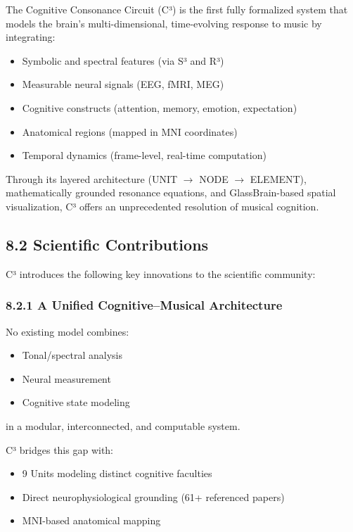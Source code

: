 The Cognitive Consonance Circuit (C³) is the first fully formalized system that models the brain’s multi-dimensional, time-evolving response to music by integrating:

\begin{itemize}
    \item Symbolic and spectral features (via S³ and R³)
    \item Measurable neural signals (EEG, fMRI, MEG)
    \item Cognitive constructs (attention, memory, emotion, expectation)
    \item Anatomical regions (mapped in MNI coordinates)
    \item Temporal dynamics (frame-level, real-time computation)
\end{itemize}

Through its layered architecture (UNIT $\rightarrow$ NODE $\rightarrow$ ELEMENT), mathematically grounded resonance equations, and GlassBrain-based spatial visualization, C³ offers an unprecedented resolution of musical cognition.

\subsection*{8.2 Scientific Contributions}

C³ introduces the following key innovations to the scientific community:

\subsubsection*{8.2.1 A Unified Cognitive–Musical Architecture}

No existing model combines:

\begin{itemize}
    \item Tonal/spectral analysis
    \item Neural measurement
    \item Cognitive state modeling
\end{itemize}

in a modular, interconnected, and computable system.

C³ bridges this gap with:

\begin{itemize}
    \item 9 Units modeling distinct cognitive faculties
    \item Direct neurophysiological grounding (61+ referenced papers)
    \item MNI-based anatomical mapping
\end{itemize}

